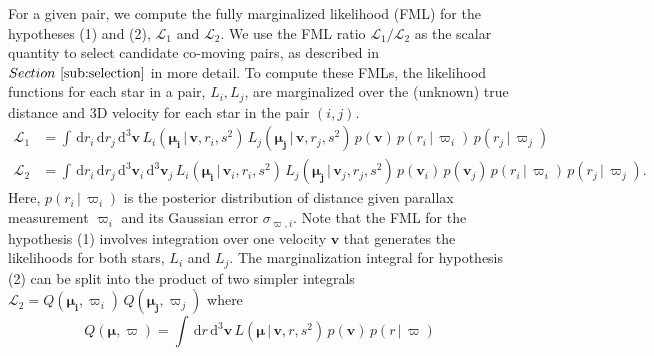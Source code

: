 \documentclass[manuscript, letterpaper]{aastex6}
\newcommand{\sectionname}{Section}
\newcommand{\given}{\,|\,}
\newcommand{\dd}{\mathrm{d}}
\newcommand{\bs}[1]{\boldsymbol{#1}}
\renewcommand{\vec}[1]{\bs{#1}}
\begin{document}
For a given pair, we compute the fully marginalized likelihood (FML) for the hypotheses (1) and (2),
$\mathcal{L}_1$ and $\mathcal{L}_2$.
We use the FML ratio $\mathcal{L}_1/\mathcal{L}_2$ as the scalar quantity to select
candidate co-moving pairs, as described in $\sectionname~\ref{sub:selection}$ in
more detail.
To compute these FMLs, the likelihood functions for each star in a pair, $L_i,
L_j$, are marginalized over the (unknown) true distance and 3D velocity for each star in
the pair $(i,j)$.
\begin{align}
  \mathcal{L}_1 &=
    \int \, \dd r_i \, \dd r_j \, \dd^3 \vec{v} \,
    L_i(\vec{\mu_i} \given \vec{v}, r_i, s^2) \,
    L_j(\vec{\mu_j} \given \vec{v}, r_j, s^2) \,
    p(\vec{v}) \, p(r_i \given \varpi_i) \, p(r_j \given \varpi_j) \label{eq:hyp1}\\
  \mathcal{L}_2 &=
    \int \, \dd r_i \, \dd r_j \, \dd^3 \vec{v}_i \, \dd^3 \vec{v}_j \,
    L_i(\vec{\mu_i} \given \vec{v}_i, r_i, s^2) \,
    L_j(\vec{\mu_j} \given \vec{v}_j, r_j, s^2) \,
    p(\vec{v}_i) \, p(\vec{v}_j) \, p(r_i \given \varpi_i) \, p(r_j \given \varpi_j). \label{eq:hyp2}
\end{align}
Here, $p(r_i \given \varpi_i)$ is the posterior distribution of distance given parallax measurement
$\varpi_i$ and its Gaussian error $\sigma_{\varpi,i}$.
Note that the FML for the hypothesis (1) involves integration over one velocity $\vec{v}$ that
generates the likelihoods for both stars, $L_i$ and $L_j$.
The marginalization integral for hypothesis (2) can be split into the product of
two simpler integrals $\mathcal{L}_2 = Q(\vec{\mu_i}, \varpi_i) \, Q(\vec{\mu_j}, \varpi_j)$ where
\begin{equation}
  Q(\vec{\mu}, \varpi) = \int \, \dd r \, \dd^3 \vec{v} \, L(\vec{\mu} \given \vec{v}, r, s^2) \,
  p(\vec{v}) \, p(r \given \varpi)
\end{equation}
\end{document}
